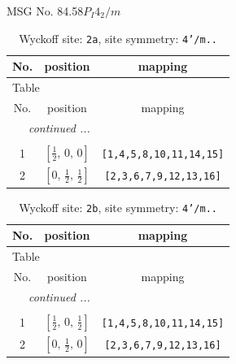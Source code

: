 \documentclass[fleqn,8pt]{jsarticle}
\begin{document}
\setcounter{MaxMatrixCols}{32}

\renewcommand{\tablename}{Table~}
\renewcommand{\figurename}{Figure~}
\begin{center}
\LARGE
MSG No. 84.58\quad$P_{I}4_{2}/m$
\end{center}
\renewcommand{\arraystretch}{1.2}
\begin{longtable}{ccc}
\caption{Wyckoff site: {\tt 2a}, site symmetry: {\tt 4'/m..}}
 \\
 \hline \hline
No. & position & mapping \\ \hline \endfirsthead

\multicolumn{2}{l}{\tablename\ \thetable{}} \\
 \hline \hline
No. & position & mapping \\ \hline \endhead

 \hline \hline
\multicolumn{2}{r}{\footnotesize\it continued ...} \\ \endfoot

 \hline \hline
\multicolumn{2}{r}{} \\ \endlastfoot

1 & $\left[ \frac{1}{2},\, 0,\, 0 \right]$ & {\tt [1,4,5,8,10,11,14,15]} \\ \hline
2 & $\left[ 0,\, \frac{1}{2},\, \frac{1}{2} \right]$ & {\tt [2,3,6,7,9,12,13,16]} \\
\end{longtable}
\renewcommand{\arraystretch}{1.2}
\begin{longtable}{ccc}
\caption{Wyckoff site: {\tt 2b}, site symmetry: {\tt 4'/m..}}
 \\
 \hline \hline
No. & position & mapping \\ \hline \endfirsthead

\multicolumn{2}{l}{\tablename\ \thetable{}} \\
 \hline \hline
No. & position & mapping \\ \hline \endhead

 \hline \hline
\multicolumn{2}{r}{\footnotesize\it continued ...} \\ \endfoot

 \hline \hline
\multicolumn{2}{r}{} \\ \endlastfoot

1 & $\left[ \frac{1}{2},\, 0,\, \frac{1}{2} \right]$ & {\tt [1,4,5,8,10,11,14,15]} \\ \hline
2 & $\left[ 0,\, \frac{1}{2},\, 0 \right]$ & {\tt [2,3,6,7,9,12,13,16]} \\
\end{longtable}
\end{document}
